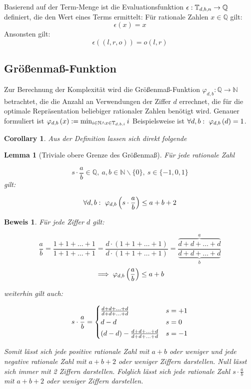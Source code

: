 \documentclass{article}
\newtheorem{corollary}{Corollary}[theorem]
\newtheorem{lemma}[theorem]{Lemma}
\theoremstyle{nonumberplain}
\newtheorem{proof-wo}{Beweis}
\begin{document}
Basierend auf der Term-Menge ist die Evaluationsfunktion \(\epsilon : \mathbb{T}_{d,b,{n}} \to \mathbb{Q}\) definiert, die den Wert eines Terms ermittelt:
Für rationale Zahlen \(x\in\mathbb{Q}\) gilt:
\[\epsilon(x) = x\]
Ansonsten gilt:
\[\epsilon((l, r, o)) = o(l,r)\]

\subsection{Größenmaß-Funktion}

Zur Berechnung der Komplexität wird die Größenmaß-Funktion \(\varphi_{d,b} : \mathbb{Q} \to \mathbb{N}\) betrachtet, die die Anzahl an Verwendungen der Ziffer \(d\) errechnet, die für die optimale Repräsentation beliebiger rationaler Zahlen benötigt wird.
Genauer formuliert ist \(\varphi_{d,b}\left(x\right) := \min_{i\in\mathbb{N} \land x \in \mathbb{T}_{d,b,{i}}} i \)
Beispielsweise ist \(\forall d, b:\ \varphi_{d,b}\left(d\right) = 1\).

\begin{corollary}
    Aus der Definition lassen sich direkt folgende
\end{corollary}

\begin{lemma}[Triviale obere Grenze des Größenmaß]
Für jede rationale Zahl

\[s\cdot\frac{a}{b}\in\mathbb{Q},\ a,b\in\mathbb{N}\backslash\{0\},\ s\in\{-1,0,1\}\]
gilt:

\[\forall d, b:\  \varphi_{d,b}\left(s\cdot\frac{a}{b}\right) \leq a + b + 2\]
\end{lemma}

\begin{proof-wo}
Für jede Ziffer \(d\) gilt:

\[\frac{a}{b}
= \frac{1 + 1 + \ldots + 1}{1 + 1 + \ldots + 1}
= \frac{d\cdot(1 + 1 + \ldots + 1)}{d\cdot(1 + 1 + \ldots + 1)}
= \frac{\overbrace{d + d + \ldots + d}^{a}}{\underbrace{d + d + \ldots + d}_{b}}\]
\[\implies \varphi_{d,b}\left(\frac{a}{b}\right) \leq a + b\]

weiterhin gilt auch:

\[s\cdot\frac{a}{b} = 
\begin{cases}
    \frac{d + d + \ldots + d}{d + d + \ldots + d} & s = +1 \vspace{0.2em}\\
    d-d & s = 0 \vspace{0.2em}\\
    (d-d) - \frac{d + d + \ldots + d}{d + d + \ldots + d} & s = -1 \\
\end{cases}\]

Somit lässt sich jede positive rationale Zahl mit \(a+b\) oder weniger und jede negative rationale Zahl mit \(a+b+2\) oder weniger Ziffern darstellen. Null lässt sich immer mit 2 Ziffern darstellen.
Folglich lässt sich jede rationale Zahl \(s\cdot\frac{a}{b}\) mit \(a+b+2\) oder weniger Ziffern darstellen.
\end{proof-wo}
\end{document}
